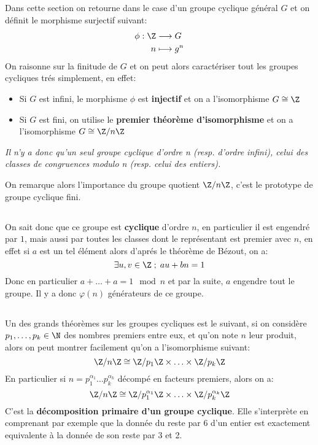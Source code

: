 \subsection*{}
Dans cette section on retourne dans le case d'un groupe cyclique général \( G \) et on définit le morphisme surjectif suivant:
\[
   \begin{aligned}
      \phi: \Z &\longrightarrow G\\
      n &\longmapsto g^n
   \end{aligned}
\]
On raisonne sur la finitude de \( G \) et on peut alors caractériser tout les groupes cycliques trés simplement, en effet:
\begin{itemize}
   \item Si \(G\) est infini, le morphisme \(\phi\) est \textbf{injectif} et on a l'isomorphisme \( G \cong \Z \)
   \item Si \(G\) est fini, on utilise le \textbf{premier théorème d'isomorphisme} et on a l'isomorphisme  \( G \cong \Z/n\Z \)
\end{itemize}
\begin{center}
   \textit{Il n'y a donc qu'un seul groupe cyclique d'ordre n (resp. d'ordre infini), celui des classes de congruences modulo n (resp. celui des entiers).}
\end{center}
On remarque alors l'importance du groupe quotient \( \Z/n\Z \), c'est le prototype de groupe cyclique fini.
\subsection*{}
On sait donc que ce groupe est \textbf{cyclique} d'ordre \( n \), en particulier il est engendré par \( 1 \), mais aussi par toutes les classes dont le représentant est premier avec \( n \), en effet si \( a \) est un tel élément alors d'aprés le théorème de Bézout, on a:
\[ 
   \exists u, v \in \Z \; ; \; au + bn = 1 
\]
Donc en particulier \( a + \ldots + a = 1 \mod{n}\) et par la suite, \( a \) engendre tout le groupe. Il y a donc \( \varphi(n) \) générateurs de ce groupe.
\subsection*{}
Un des grands théorèmes sur les groupes cycliques est le suivant, si on considère \( p_1, \ldots, p_k \in \N \) des nombres premiers entre eux, et qu'on note \( n \) leur produit, alors on peut montrer facilement qu'on a l'isomorphisme suivant:
\[ 
   \Z/n \Z \cong \Z/ p_1 \Z \times \ldots \times \Z/ p_k \Z
\]
En particulier si \( n = p_1^{\alpha_1} \ldots p_k^{\alpha_k} \) décompé en facteurs premiers, alors on a:
\[ 
   \Z/n \Z \cong \Z/ p_1^{ \alpha_1} \Z \times \ldots \times \Z/ p_k^{ \alpha_k} \Z
\]
C'est la \textbf{décomposition primaire d'un groupe cyclique}. Elle s'interprète en comprenant par exemple que la donnée du reste par 6 d'un entier est exactement equivalente à la donnée de son reste par 3 et 2.

